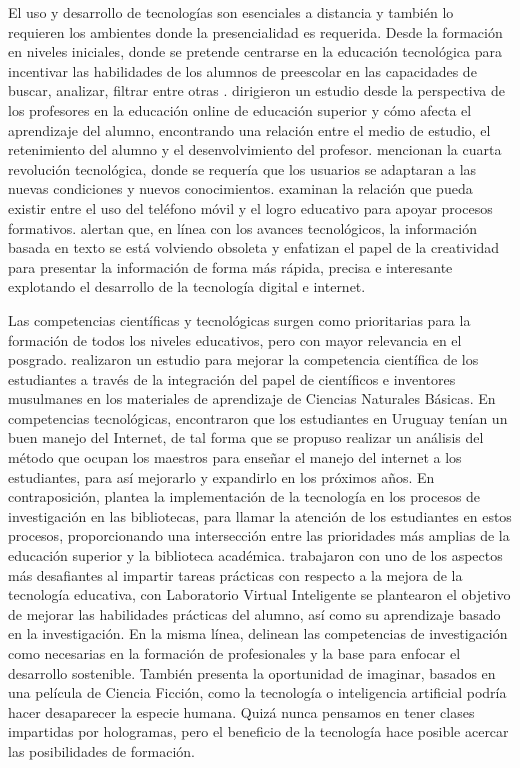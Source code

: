 \documentclass[spanish]{textolivre}
\begin{document}
El uso y desarrollo de tecnologías son esenciales a distancia y también lo requieren los ambientes donde la presencialidad es requerida.  Desde la formación en niveles iniciales, donde se pretende centrarse en la educación tecnológica para incentivar las habilidades de los alumnos de preescolar en las capacidades de buscar, analizar, filtrar entre otras \cite{ferres_three_2018}. \textcite{lee_study_2018} dirigieron un estudio desde la perspectiva de los profesores en la educación online de educación superior y cómo afecta el aprendizaje del alumno, encontrando una relación entre el medio de estudio, el retenimiento del alumno y el desenvolvimiento del profesor. \textcite{milic_implementation_2017} mencionan la cuarta revolución tecnológica, donde se requería que los usuarios se adaptaran a las nuevas condiciones y nuevos conocimientos. \textcite{kates_effects_2018} examinan la relación que pueda existir entre el uso del teléfono móvil y el logro educativo para apoyar procesos formativos. \textcite{sudiartha_bandwidth_2018} alertan que, en línea con los avances tecnológicos, la información basada en texto se está volviendo obsoleta y enfatizan el papel de la creatividad para presentar la información de forma más rápida, precisa e interesante explotando el desarrollo de la tecnología digital e internet.

Las competencias científicas y tecnológicas surgen como prioritarias para la formación de todos los niveles educativos, pero con mayor relevancia en el posgrado. \textcite{mardiana_development_2018} realizaron un estudio para mejorar la competencia científica de los estudiantes a través de la integración del papel de científicos e inventores musulmanes en los materiales de aprendizaje de Ciencias Naturales Básicas. En competencias tecnológicas, \textcite{mateu_plan_2018} encontraron que los estudiantes en Uruguay tenían un buen manejo del Internet, de tal forma que se propuso realizar un análisis del método que ocupan los maestros para enseñar el manejo del internet a los estudiantes, para así mejorarlo y expandirlo en los próximos años. En contraposición, \textcite{todorinova_mixed-method_2018} plantea la implementación de la tecnología en los procesos de investigación en las bibliotecas, para llamar la atención de los estudiantes en estos procesos, proporcionando una intersección entre las prioridades más amplias de la educación superior y la biblioteca académica. \textcite{munawar_move_2018} trabajaron con uno de los aspectos más desafiantes al impartir tareas prácticas con respecto a la mejora de la tecnología educativa, con Laboratorio Virtual Inteligente se plantearon el objetivo de mejorar las habilidades prácticas del alumno, así como su aprendizaje basado en la investigación. En la misma línea, \textcite{castillo-martinez_research_2021} delinean las competencias de investigación como necesarias en la formación de profesionales y la base para enfocar el desarrollo sostenible. También \textcite{gonzalez_concepcion_2017} presenta la oportunidad de imaginar, basados en una película de Ciencia Ficción, como la tecnología o inteligencia artificial podría hacer desaparecer la especie humana. Quizá nunca pensamos en tener clases impartidas por hologramas, pero el beneficio de la tecnología hace posible acercar las posibilidades de formación.
\end{document}
